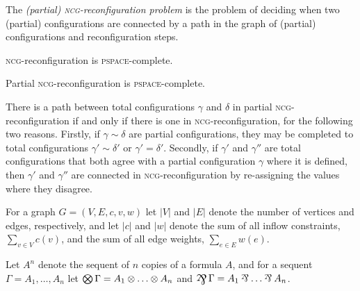 \documentclass[conference,onecolumn]{IEEEtran}
\begin{document}
The \emph{(partial) \textsc{ncg}-reconfiguration problem} is the problem of deciding when two (partial) configurations are connected by a path in the graph of (partial) configurations and reconfiguration steps.

\begin{theorem}
\textsc{ncg}-reconfiguration is \textsc{pspace}-complete.
\end{theorem}

\begin{proposition}
Partial \textsc{ncg}-reconfiguration is \textsc{pspace}-complete.
\end{proposition}

\begin{IEEEproof}
There is a path between total configurations $\gamma$ and $\delta$ in partial \textsc{ncg}-reconfiguration if and only if there is one in \textsc{ncg}-reconfiguration, for the following two reasons.
%
Firstly, if $\gamma\sim\delta$ are partial configurations, they may be completed to total configurations $\gamma'\sim\delta'$ or $\gamma'=\delta'$.
%
Secondly, if $\gamma'$ and $\gamma''$ are total configurations that both agree with a partial configuration $\gamma$ where it is defined, then $\gamma'$ and $\gamma''$ are connected in \textsc{ncg}-reconfiguration by re-assigning the values where they disagree.
%
\end{IEEEproof}


For a graph $G=(V,E,c,v,w)$ let $|V|$ and $|E|$ denote the number of vertices and edges, respectively, and let $|c|$ and $|w|$ denote the sum of all inflow constraints, $\sum_{v\in V}c(v)$, and the sum of all edge weights, $\sum_{e\in E}w(e)$.


Let $A^n$ denote the sequent of $n$ copies of a formula $A$, and for a sequent $\Gamma=A_1,\dotsc,A_n$ let $\bigotimes\Gamma=A_1\otimes\dotso\otimes A_n$ and $\bigparr\Gamma=A_1\parr\dotso\parr A_n$.
\end{document}
